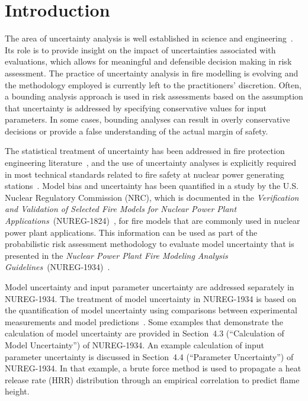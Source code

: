 \documentclass[12pt]{article}
\begin{document}
\section{Introduction}
\label{sec:introduction}

The area of uncertainty analysis is well established in science and engineering~\cite{Morgan, Spiegel, Vose, Kumamoto, Haimes}. Its role is to provide insight on the impact of uncertainties associated with evaluations, which allows for meaningful and defensible decision making in risk assessment. The practice of uncertainty analysis in fire modelling is evolving and the methodology employed is currently left to the practitioners' discretion. Often, a bounding analysis approach is used in risk assessments based on the assumption that uncertainty is addressed by specifying conservative values for input parameters. In some cases, bounding analyses can result in overly conservative decisions or provide a false understanding of the actual margin of safety. 

The statistical treatment of uncertainty has been addressed in fire protection engineering literature~\cite{Notarianni:SFPE, McGrattan2011a, Notarianni:1999, Lundin, Hostikka:2003a, Upadhyay2008}, and the use of uncertainty analyses is explicitly required in most technical standards related to fire safety at nuclear power generating stations~\cite{NFPA:805, NUREG:6850}. Model bias and uncertainty has been quantified in a study by the U.S. Nuclear Regulatory Commission (NRC), which is documented in the \emph{Verification and Validation of Selected Fire Models for Nuclear Power Plant Applications}~(NUREG-1824)~\cite{NUREG_1824}, for fire models that are commonly used in nuclear power plant applications. This information can be used as part of the probabilistic risk assessment methodology to evaluate model uncertainty that is presented in the \emph{Nuclear Power Plant Fire Modeling Analysis Guidelines}~(NUREG-1934)~\cite{NUREG_1934}. 

Model uncertainty and input parameter uncertainty are addressed separately in NUREG-1934. The treatment of model uncertainty in NUREG-1934 is based on the quantification of model uncertainty using comparisons between experimental measurements and model predictions~\cite{McGrattan2011a}. Some examples that demonstrate the calculation of model uncertainty are provided in Section~4.3 (``Calculation of Model Uncertainty'') of NUREG-1934. An example calculation of input parameter uncertainty is discussed in Section~4.4 (``Parameter Uncertainty'') of NUREG-1934. In that example, a brute force method is used to propagate a heat release rate (HRR) distribution through an empirical correlation to predict flame height.
\end{document}

